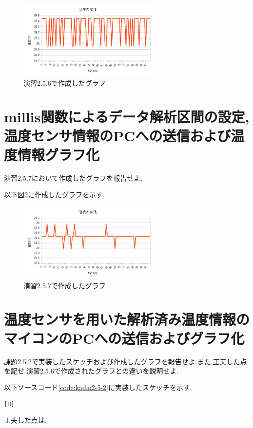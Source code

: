 \documentclass{jarticle}
\begin{document}
\begin{figure}[H]
\begin{center}
\includegraphics[width=7.0cm]{images/enshu2-5-6.png}
\caption{演習2.5.6で作成したグラフ}
\label{fig:enshu2-5-6}
\end{center}
\end{figure}

\section{millis関数によるデータ解析区間の設定,温度センサ情報のPCへの送信および温度情報グラフ化}
演習2.5.7において作成したグラフを報告せよ.

以下図\ref{fig:enshu2-5-7}に作成したグラフを示す.

\begin{figure}[H]
\begin{center}
\includegraphics[width=7.0cm]{images/enshu2-5-7.png}
\caption{演習2.5.7で作成したグラフ}
\label{fig:enshu2-5-7}
\end{center}
\end{figure}

\section{温度センサを用いた解析済み温度情報のマイコンのPCへの送信およびグラフ化}
課題2.5.2で実装したスケッチおよび作成したグラフを報告せよ.また,工夫した点を記せ.演習2.5.6で作成されたグラフとの違いを説明せよ.

以下ソースコード\ref{code:kadai2-5-2}に実装したスケッチを示す.
\begin{lstlisting}[caption = 課題2.5.2,label=code:kadai2-5-2][H]

\end{lstlisting}
工夫した点は,
\end{document}
